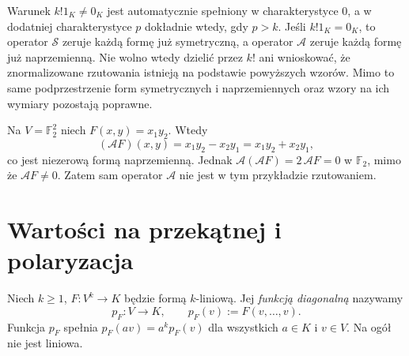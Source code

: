 \begin{uwaga}
\label{rem:lin8-char-faktorial}
Warunek \(k!1_K\ne0_K\)
jest automatycznie spełniony
w charakterystyce \(0\), a w
dodatniej charakterystyce \(p\)
dokładnie wtedy, gdy \(p>k\).
Jeśli \(k!1_K=0_K\), to
operator \(\mathcal S\)
zeruje każdą formę już symetryczną,
a operator \(\mathcal A\)
zeruje każdą formę już naprzemienną.
Nie wolno wtedy dzielić przez \(k!\)
ani wnioskować, że znormalizowane
rzutowania istnieją na podstawie
powyższych wzorów.
Mimo to same podprzestrzenie
form symetrycznych i naprzemiennych
oraz wzory na ich wymiary pozostają
poprawne.
\end{uwaga}

\begin{przyklad}
\label{prz:lin8-alt-f2}
Na \(V=\mathbb F_2^2\) niech
\(F(x,y)=x_1y_2\).
Wtedy
\[
 (\mathcal AF)(x,y)
 =x_1y_2-x_2y_1
 =x_1y_2+x_2y_1,
\]
co jest niezerową formą naprzemienną.
Jednak \(\mathcal A(\mathcal AF)=
2\,\mathcal AF=0\)
w \(\mathbb F_2\), mimo że
\(\mathcal AF\ne0\).
Zatem sam operator
\(\mathcal A\) nie jest
w tym przykładzie rzutowaniem.
\end{przyklad}

\section{Wartości na przekątnej i polaryzacja}
\label{sec:lin8-polaryzacja}

\begin{definicja}
\label{def:lin8-diagonalna}
Niech \(k\geq1\),
\(F\colon V^k\to K\)
będzie formą \(k\)-liniową.
Jej \emph{funkcją diagonalną}
nazywamy
\[
 p_F\colon V\to K,\qquad
 p_F(v):=F(v,\ldots,v).
\]
Funkcja \(p_F\) spełnia
\(p_F(av)=a^kp_F(v)\)
dla wszystkich \(a\in K\)
i \(v\in V\).
Na ogół nie jest liniowa.
\end{definicja}

